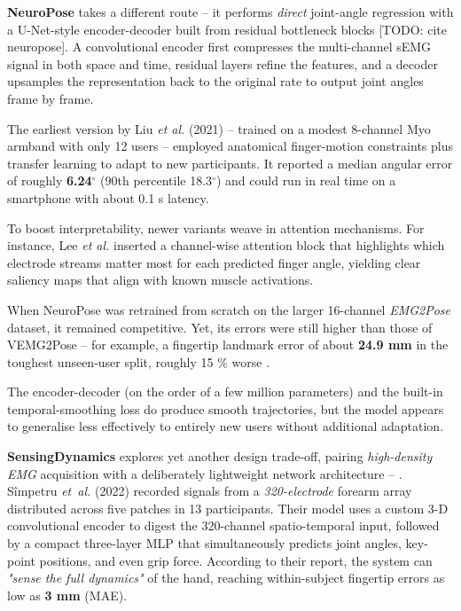 \textbf{NeuroPose} takes a different route -- it performs \emph{direct} joint-angle regression with a U-Net-style encoder-decoder built from residual bottleneck blocks [TODO: cite neuropose]. A convolutional encoder first compresses the multi-channel sEMG signal in both space and time, residual layers refine the features, and a decoder upsamples the representation back to the original rate to output joint angles frame by frame.

The earliest version by Liu \textit{et al.} (2021) -- trained on a modest 8-channel Myo armband with only 12 users -- employed anatomical finger-motion constraints plus transfer learning to adapt to new participants. It reported a median angular error of roughly \textbf{6.24$^\circ$} (90th percentile 18.3$^\circ$) and could run in real time on a smartphone with about 0.1 s latency.

To boost interpretability, newer variants weave in attention mechanisms. For instance, Lee \textit{et al.} \cite{lee2022explainable} inserted a channel-wise attention block that highlights which electrode streams matter most for each predicted finger angle, yielding clear saliency maps that align with known muscle activations.

When NeuroPose was retrained from scratch on the larger 16-channel \textit{EMG2Pose} dataset, it remained competitive. Yet, its errors were still higher than those of VEMG2Pose -- for example, a fingertip landmark error of about \textbf{24.9 mm} in the toughest unseen-user split, roughly 15 \% worse \cite{salter2024emg2pose}.

The encoder-decoder (on the order of a few million parameters) and the built-in temporal-smoothing loss do produce smooth trajectories, but the model appears to generalise less effectively to entirely new users without additional adaptation.

\textbf{SensingDynamics} explores yet another design trade-off, pairing \textit{high-density EMG} acquisition with a deliberately lightweight network architecture -- \cite{simpetru10sensing}.
S\^{i}mpetru \textit{et~al.} (2022) recorded signals from a \textit{320-electrode} forearm array distributed across five patches in 13 participants. Their model uses a custom 3-D convolutional encoder to digest the 320-channel spatio-temporal input, followed by a compact three-layer MLP that simultaneously predicts joint angles, key-point positions, and even grip force. According to their report, the system can \emph{"sense the full dynamics"} of the hand, reaching within-subject fingertip errors as low as \textbf{3 mm} (MAE).

